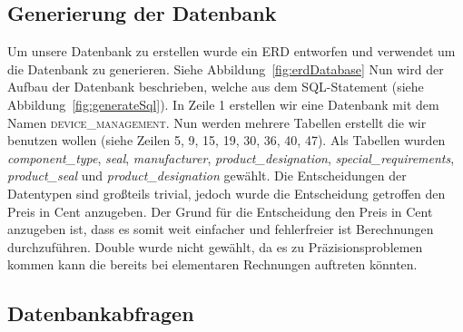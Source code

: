 \documentclass{article}
\begin{document}
\subsection{Generierung der Datenbank}
 Um unsere Datenbank zu erstellen wurde ein ERD entworfen und verwendet um die Datenbank zu generieren. Siehe Abbildung~\ref{fig:erdDatabase}
Nun wird der Aufbau der Datenbank beschrieben, welche aus dem SQL-Statement (siehe Abbildung~\ref{fig:generateSql}).
In Zeile 1 erstellen wir eine Datenbank mit dem Namen \textsc{device\_management}. Nun werden mehrere Tabellen erstellt die wir benutzen wollen (siehe Zeilen 5, 9, 15, 19, 30, 36, 40, 47). Als Tabellen wurden \textit{component\_type}, \textit{seal}, \textit{manufacturer}, \textit{product\_designation}, \textit{special\_requirements}, \textit{product\_seal} und \textit{product\_designation} gewählt.\newline
\newline
Die Entscheidungen der Datentypen sind großteils trivial, jedoch wurde die Entscheidung getroffen den Preis in Cent anzugeben.
Der Grund für die Entscheidung den Preis in Cent anzugeben ist, dass es somit weit einfacher und fehlerfreier ist Berechnungen durchzuführen. Double wurde nicht gewählt, da es zu Präzisionsproblemen kommen kann die bereits bei elementaren Rechnungen auftreten könnten.



\subsection{Datenbankabfragen}
\newpage
\end{document}
